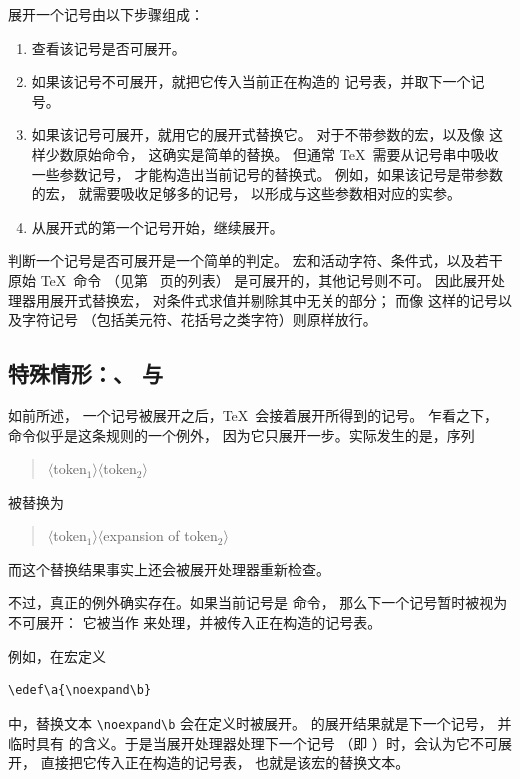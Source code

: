 \documentclass[a4paper]{rapport3}
\def\gr#1{$\langle$#1$\rangle$}\def\key#1{{\tt#1}}
\newenvironment{disp}{\begin{quotation}}{\end{quotation}}
\begin{document}
展开一个记号由以下步骤组成：
\begin{enumerate}
\item 查看该记号是否可展开。
\item 如果该记号不可展开，就把它传入当前正在构造的
      记号表，并取下一个记号。

\item 如果该记号可展开，就用它的展开式替换它。
      对于不带参数的宏，以及像  这样少数原始命令，
      这确实是简单的替换。
      但通常 \TeX\ 需要从记号串中吸收一些参数记号，
      才能构造出当前记号的替换式。
      例如，如果该记号是带参数的宏，
      就需要吸收足够多的记号，
      以形成与这些参数相对应的实参。

\item 从展开式的第一个记号开始，继续展开。
\end{enumerate}
%
判断一个记号是否可展开是一个简单的判定。
宏和活动字符、条件式，以及若干原始 \TeX\ 命令
\awp
（见第~\pageref{expand:lijst} 页的列表）
是可展开的，其他记号则不可。
因此展开处理器用展开式替换宏，
对条件式求值并剔除其中无关的部分；
而像  这样的记号以及字符记号
（包括美元符、花括号之类字符）则原样放行。
\subsection{特殊情形：、 与 }

如前所述，
一个记号被展开之后，\TeX\ 会接着展开所得到的记号。
乍看之下， 命令似乎是这条规则的一个例外，
因为它只展开一步。实际发生的是，序列
\begin{disp}\gr{token$_1$}\gr{token$_2$}\end{disp}
被替换为
\begin{disp}\gr{token$_1$}\gr{\italic expansion of token$_2$}\end{disp}
而这个替换结果事实上还会被展开处理器重新检查。

不过，真正的例外确实存在。如果当前记号是  命令，
那么下一个记号暂时被视为不可展开：
它被当作  来处理，并被传入正在构造的记号表。

例如，在宏定义
\begin{verbatim}
\edef\a{\noexpand\b}
\end{verbatim}
中，替换文本 \verb>\noexpand\b> 会在定义时被展开。
 的展开结果就是下一个记号，
并临时具有  的含义。于是当展开处理器处理下一个记号
（即 ）时，会认为它不可展开，
直接把它传入正在构造的记号表，
也就是该宏的替换文本。
\end{document}
